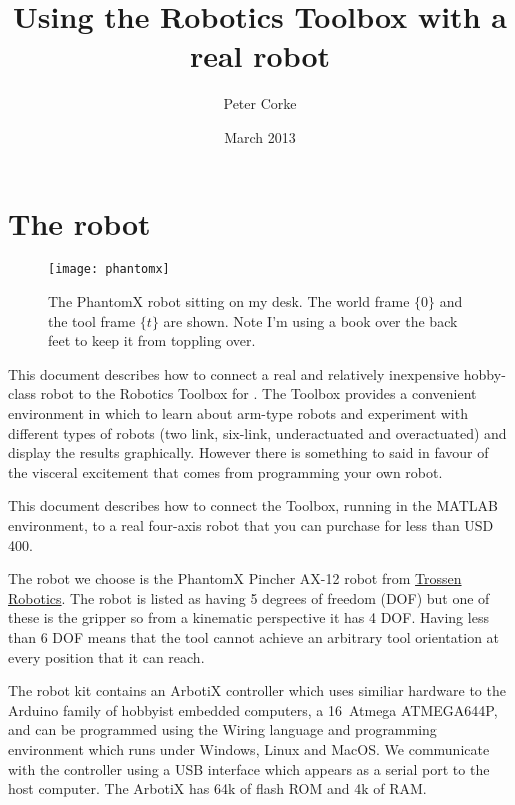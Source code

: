 \documentclass[11pt]{article}
\title{Using the Robotics Toolbox  with a real robot}
\author{Peter Corke}
\date{March 2013}                                           %
\begin{document}
\maketitle

\section{The robot}
\begin{figure}[b]
\centering
\texttt{[image: phantomx]}
\caption{The PhantomX robot sitting on my desk.  The world frame $\{\!0\!\}$ and the tool frame $\{\!t\!\}$
are shown.
Note I'm using a book over the back feet to keep it from
toppling over.}
\label{fig:phantomx}
\end{figure}

This document describes how to connect a real and relatively inexpensive hobby-class robot to the Robotics
Toolbox\cite{Corke11a} for \Mlab.
The Toolbox provides a convenient environment in which to learn about arm-type robots and experiment with 
different types of robots (two link, six-link, underactuated and overactuated) and display the results graphically.
However there is something to said in favour of the visceral excitement that comes from programming your own
robot.

This document describes how to connect the Toolbox, running in the MATLAB environment, to a real four-axis robot
that you can purchase for less than USD 400.

The robot we choose is the PhantomX Pincher AX-12 robot from \href{http://www.trossenrobotics.com/p/PhantomX-Pincher-Robot-Arm.aspx}{Trossen Robotics}.
The robot is listed as having 5 degrees of freedom (DOF) but one of these is the gripper so from a kinematic perspective
it has 4 DOF.  Having less than 6 DOF means that the tool cannot achieve an arbitrary tool orientation at every position
that it can reach.

The robot kit contains an ArbotiX controller which uses similiar hardware to the Arduino family of hobbyist embedded computers, a 16\MHz\ Atmega ATMEGA644P, and can be programmed using the Wiring language and programming environment which
runs under Windows, Linux and MacOS.  We communicate with the controller using a USB interface which appears as
a serial port to the host computer.
The ArbotiX has  64k of flash ROM and 4k of RAM.
\end{document}
